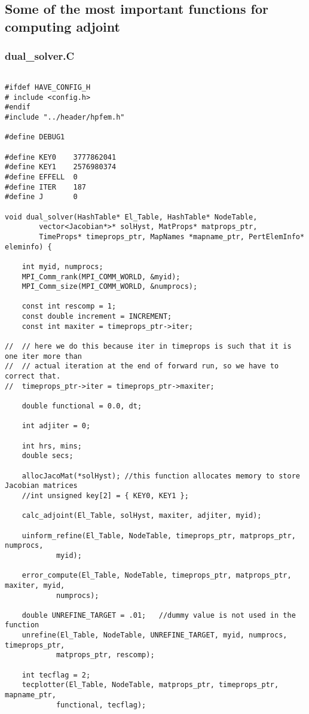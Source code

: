 \documentclass[a4paper,10pt]{article}
\begin{document}
\subsection{Some of the most important functions for computing adjoint}
\subsubsection{dual\_solver.C}
\begin{lstlisting}

#ifdef HAVE_CONFIG_H
# include <config.h>
#endif
#include "../header/hpfem.h"

#define DEBUG1

#define KEY0    3777862041
#define KEY1    2576980374
#define EFFELL  0
#define ITER    187
#define J       0

void dual_solver(HashTable* El_Table, HashTable* NodeTable,
		vector<Jacobian*>* solHyst, MatProps* matprops_ptr,
		TimeProps* timeprops_ptr, MapNames *mapname_ptr, PertElemInfo* eleminfo) {

	int myid, numprocs;
	MPI_Comm_rank(MPI_COMM_WORLD, &myid);
	MPI_Comm_size(MPI_COMM_WORLD, &numprocs);

	const int rescomp = 1;
	const double increment = INCREMENT;
	const int maxiter = timeprops_ptr->iter;

//	// here we do this because iter in timeprops is such that it is one iter more than
//	// actual iteration at the end of forward run, so we have to correct that.
//	timeprops_ptr->iter = timeprops_ptr->maxiter;

	double functional = 0.0, dt;

	int adjiter = 0;

	int hrs, mins;
	double secs;

	allocJacoMat(*solHyst); //this function allocates memory to store Jacobian matrices
	//int unsigned key[2] = { KEY0, KEY1 };

	calc_adjoint(El_Table, solHyst, maxiter, adjiter, myid);

	uinform_refine(El_Table, NodeTable, timeprops_ptr, matprops_ptr, numprocs,
			myid);

	error_compute(El_Table, NodeTable, timeprops_ptr, matprops_ptr, maxiter, myid,
			numprocs);

	double UNREFINE_TARGET = .01;	//dummy value is not used in the function
	unrefine(El_Table, NodeTable, UNREFINE_TARGET, myid, numprocs, timeprops_ptr,
			matprops_ptr, rescomp);

	int tecflag = 2;
	tecplotter(El_Table, NodeTable, matprops_ptr, timeprops_ptr, mapname_ptr,
			functional, tecflag);


\end{lstlisting}
\end{document}
